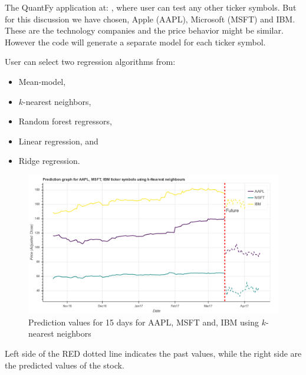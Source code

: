\documentclass[12pt]{article}
\begin{document}
\begin{itemize}
The QuantFy application at: \href{http://quantfy.herokuapp.com/mlModels}{\color{blue}{http://quantfy.herokuapp.com/mlModels}}, where user can test any other ticker symbols. But for this discussion we have chosen, Apple (AAPL), Microsoft (MSFT) and IBM. These are the technology companies and the price behavior might be similar. However the code will generate a separate model for each ticker symbol.

User can select two regression algorithms from:

\begin{itemize}
\item Mean-model,
\item $k$-nearest neighbors,
\item Random forest regressors,
\item Linear regression, and
\item Ridge regression.
\end{itemize}

\begin{figure}[!htbp]

\begin{center}
\includegraphics[height=0.4\textheight,width=\textwidth]{knn_model.png}
\caption{Prediction values for 15 days for AAPL, MSFT and, IBM using $k$-nearest neighbors }
\label{fig:knn_mdl}
\end{center}
\end{figure}

Left side of the RED dotted line indicates the past values, while the right side are the predicted values of the stock. 


\end{itemize}
\end{document}
